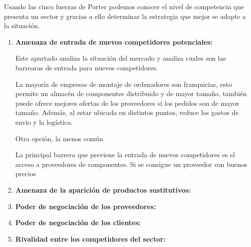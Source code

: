 Usando las cinco fuerzas de Porter podemos conocer el nivel de competencia que presenta un sector y gracias a ello determinar la estrategia que mejor se adapte a la situación. 

\begin{enumerate}
    \item \textbf{Amenaza de entrada de nuevos competidores potenciales:}
    
    Este apartado analiza la situación del mercado y analiza cuales son las barrearas de entrada para nuevos competidores.

    La mayoría de empresas de montaje de ordenadores son franquicias, esto permite un almacén de componentes distribuido y de mayor tamaño, también puede ofrece mejores ofertas de los proveedores si los pedidos son de mayor tamaño. Además, al estar ubicada en distintos puntos, reduce los gastos de envio y la logística. 

    Otra opción, la menos común 

    La principal barrera que previene la entrada de nuevos competidores es el acceso a proveedores de componentes. Si se consigue un proveedor con buenos precios  
    \item \textbf{Amenaza de la aparición de productos sustitutivos:}
    \item \textbf{Poder de negociación de los proveedores:}
    \item \textbf{Poder de negociación de los clientes:}
    \item \textbf{Rivalidad entre los competidores del sector:}
\end{enumerate}
